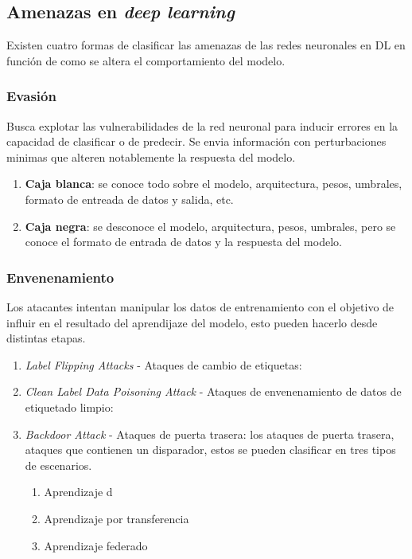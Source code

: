 
\subsection{Amenazas en \textit{deep learning}}
Existen cuatro formas de clasificar las amenazas de las redes neuronales en \gls{DL} en función de como se altera el comportamiento del modelo.

\subsubsection{Evasión}

Busca explotar las vulnerabilidades de la red neuronal para inducir errores en la capacidad de clasificar o de predecir. Se envia información con perturbaciones minimas que alteren notablemente la respuesta del modelo.

\begin{enumerate}
    \item \textbf{Caja blanca}: se conoce todo sobre el modelo, arquitectura, pesos, umbrales, formato de entreada de datos y salida, etc. \cite{learning-machine-learning-part-3-attacking}
    \item \textbf{Caja negra}: se desconoce el modelo, arquitectura, pesos, umbrales, pero se conoce el formato de entrada de datos y la respuesta del modelo. \cite{learning-machine-learning-part-3-attacking}
\end{enumerate}

\subsubsection{Envenenamiento}
% 

Los atacantes intentan manipular los datos de entrenamiento con el objetivo de influir en el resultado del aprendijaze del modelo, esto pueden hacerlo desde distintas etapas.


\begin{enumerate}
    \item \textit{Label Flipping Attacks} - Ataques de cambio de etiquetas:
    \item \textit{Clean Label Data Poisoning Attack} - Ataques de envenenamiento de datos de etiquetado limpio:
    \item \textit{Backdoor Attack} - Ataques de puerta trasera: los ataques de puerta trasera, ataques que contienen un disparador, estos se pueden clasificar en tres tipos de escenarios.
          \begin{enumerate}
              \item Aprendizaje d
              \item Aprendizaje por transferencia
              \item Aprendizaje federado
          \end{enumerate}
\end{enumerate}

